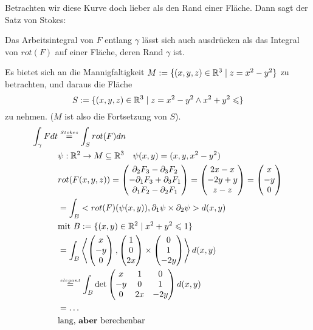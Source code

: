 \documentclass[main.tex]{subfiles}
\begin{document}
\begin{Beispiel}
  Betrachten wir diese Kurve doch lieber als den Rand einer Fläche. Dann sagt der Satz von Stokes:

  Das Arbeitsintegral von $F$ entlang $\gamma$ lässt sich auch ausdrücken als das Integral von $rot(F)$ auf einer Fläche, deren Rand $\gamma$ ist.

  Es bietet sich an die Mannigfaltigkeit $M := \{(x,y,z) \in \mathbb{R}^3 \mid z = x^2 -y^2\}$ zu betrachten, und daraus die Fläche
  $$S := \{(x,y,z) \in \mathbb{R}^3 \mid z = x^2 -y^2 \land x^2 + y^2 \leqslant \}$$
  zu nehmen. ($M$ ist also die Fortsetzung von $S$).
  $$\begin{aligned}
    \int_\gamma F dt & \stackrel{\scriptscriptstyle Stokes}{=} \int_S rot(F) dn \\
    & \psi : \mathbb{R}^2 \to M \subseteq \mathbb{R}^3 \quad \psi(x,y) = (x,y,x^2 - y^2) \\
    & rot(F(x,y,z)) = \begin{pmatrix}
      \partial_2 F_3 - \partial_3 F_2 \\ -\partial_1 F_3 + \partial_3 F_1 \\ \partial_1 F_2 - \partial_2 F_1
    \end{pmatrix} = \begin{pmatrix}
      2x - x \\ -2y + y \\ z - z
    \end{pmatrix} = \begin{pmatrix}
      x \\ -y \\ 0
    \end{pmatrix} \\
    & = \int_B <rot(F)(\psi(x,y)),\partial_1 \psi \times \partial_2 \psi> d(x,y) \\
    & \text{mit } B := \{(x,y) \in \mathbb{R}^2 \mid x^2 + y^2 \leqslant 1\} \\
    & =\int_B \left<\begin{pmatrix}
      x \\ -y \\ 0
    \end{pmatrix}, \begin{pmatrix}
      1 \\ 0 \\2x
    \end{pmatrix} \times \begin{pmatrix}
      0 \\ 1 \\ -2y
    \end{pmatrix}\right> d(x,y) \\
    & \stackrel{\scriptscriptstyle elegant}{=} \int_B \det\begin{pmatrix}
      x & 1 & 0 \\ -y & 0 & 1 \\ 0 & 2x & -2y
    \end{pmatrix} d(x,y) \\
    & = \dots \\
    & \text{lang, \textbf{aber} berechenbar}
  \end{aligned}$$
\end{Beispiel}
\end{document}
